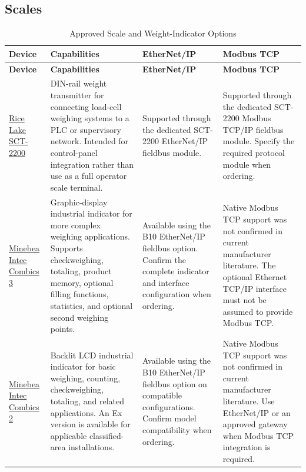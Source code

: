 \subsection{Scales}
\begin{small}
\setlength{\tabcolsep}{4pt}
\begin{longtable}{@{}P{3.0cm}P{5.3cm}P{3.5cm}P{3.5cm}@{}}
\caption{Approved Scale and Weight-Indicator Options}\label{tab:scales} \\
\toprule
{}\textbf{Device} & \textbf{Capabilities} & \textbf{EtherNet/IP} & \textbf{Modbus TCP} \\
\midrule
\endfirsthead
\toprule
{}\textbf{Device} & \textbf{Capabilities} & \textbf{EtherNet/IP} & \textbf{Modbus TCP} \\
\midrule
\endhead
\href{https://www.ricelake.com/resources/catalogs/sct-2200-catalog-page}{Rice Lake SCT-2200} & DIN-rail weight transmitter for connecting load-cell weighing systems to a PLC or supervisory network. Intended for control-panel integration rather than use as a full operator scale terminal. & Supported through the dedicated SCT-2200 EtherNet/IP fieldbus module. & Supported through the dedicated SCT-2200 Modbus TCP/IP fieldbus module. Specify the required protocol module when ordering. \\
\href{https://www.minebea-intec.com/en/industrial-scales/weight-indicators/weight-indicator-combics}{Minebea Intec Combics 3} & Graphic-display industrial indicator for more complex weighing applications. Supports checkweighing, totaling, product memory, optional filling functions, statistics, and optional second weighing points. & Available using the B10 EtherNet/IP fieldbus option. Confirm the complete indicator and interface configuration when ordering. & Native Modbus TCP support was not confirmed in current manufacturer literature. The optional Ethernet TCP/IP interface must not be assumed to provide Modbus TCP. \\
\href{https://www.minebea-intec.com/en/industrial-scales/weight-indicators/weight-indicator-combics}{Minebea Intec Combics 2} & Backlit LCD industrial indicator for basic weighing, counting, checkweighing, totaling, and related applications. An Ex version is available for applicable classified-area installations. & Available using the B10 EtherNet/IP fieldbus option on compatible configurations. Confirm model compatibility when ordering. & Native Modbus TCP support was not confirmed in current manufacturer literature. Use EtherNet/IP or an approved gateway when Modbus TCP integration is required. \\
\bottomrule
\end{longtable}
\end{small}

